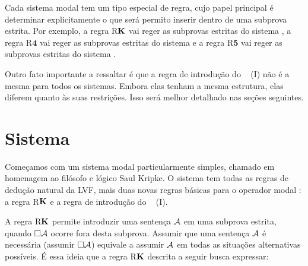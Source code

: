 Cada sistema modal tem um tipo especial de regra, cujo papel principal é determinar explicitamente o que será permito inserir dentro de uma subprova estrita. Por exemplo, a regra R$\mathbf{K}$ vai reger as subprovas estritas do sistema \mlK, a regra R$\mathbf{4}$ vai reger as subprovas  estritas do sistema \mlSfour{} e a regra R$\mathbf{5}$ vai reger as subprovas estritas do sistema \mlSfive{}. 

 Outro fato importante a ressaltar é que a regra de introdução do ~\ebox{} (\ebox I) não é a mesma para todos os sistemas. Embora elas tenham a mesma estrutura, elas diferem quanto às suas restrições. Isso será melhor detalhado nas seções seguintes. 





\section{Sistema \mlK}
\label{K}

Começamos com um sistema modal particularmente simples, chamado \mlK{} em homenagem ao filósofo e lógico Saul Kripke. O sistema \mlK{} tem todas as regras de dedução natural da  LVF, mais duas novas regras básicas para o operador modal \ebox{}: a regra R$\mathbf{K}$  e  a regra de introdução  do ~\ebox{} (\ebox I).

 A regra R$\mathbf{K}$ permite introduzir uma sentença $\mathcal{A}$ em uma subprova estrita, quando $\Box \mathcal{A}$ ocorre fora desta subprova. Assumir que uma sentença $\mathcal{A}$ é necessária (assumir $\Box\mathcal{A}$) equivale a assumir $\mathcal{A}$ em todas as situações alternativas possíveis. É essa ideia que a regra R$\mathbf{K}$ descrita a seguir busca expressar:



